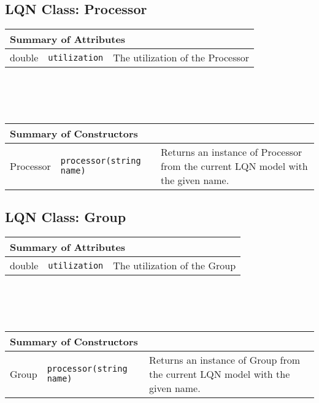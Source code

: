 \subsection{LQN Class: Processor}
\begin{tabular}{|p{1.0in}|p{2.3in}||p{2.8in}|}
  \hline
  \multicolumn{3}{|l|}{\textbf{Summary of Attributes}}\\
  \hline
  double & {\tt utilization} & The utilization of the Processor\\
  \hline
\end{tabular}
\\\\\ \\
\begin{tabular}{|p{1.0in}|p{2.3in}||p{2.8in}|}
  \hline
  \multicolumn{3}{|l|}{\textbf{Summary of Constructors}}\\
  \hline
  Processor & {\tt processor(string name)} & Returns an instance of Processor from the current LQN model with the given name.\\
  \hline
\end{tabular}

\subsection{LQN Class: Group}
\begin{tabular}{|p{1.0in}|p{2.3in}||p{2.8in}|}
  \hline
  \multicolumn{3}{|l|}{\textbf{Summary of Attributes}}\\
  \hline
  double & {\tt utilization} & The utilization of the Group\\
  \hline
\end{tabular}
\\\\\ \\
\begin{tabular}{|p{1.0in}|p{2.3in}||p{2.8in}|}
  \hline
  \multicolumn{3}{|l|}{\textbf{Summary of Constructors}}\\
  \hline
  Group & {\tt processor(string name)} & Returns an instance of Group from the current LQN model with the given name.\\
  \hline
\end{tabular}

